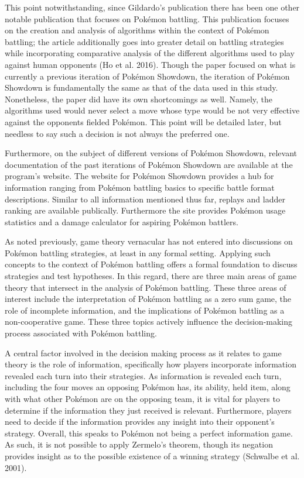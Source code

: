 \documentclass[12pt,twoside]{reedthesis}
\begin{document}
  This point notwithstanding, since Gildardo's publication there has been
  one other notable publication that focuses on Pokémon battling. This
  publication focuses on the creation and analysis of algorithms within
  the context of Pokémon battling; the article additionally goes into
  greater detail on battling strategies while incorporating comparative
  analysis of the different algorithms used to play against human
  opponents (Ho et al. 2016). Though the paper focused on what is
  currently a previous iteration of Pokémon Showdown, the iteration of
  Pokémon Showdown is fundamentally the same as that of the data used in
  this study. Nonetheless, the paper did have its own shortcomings as
  well. Namely, the algorithms used would never select a move whose type
  would be not very effective against the opponents fielded Pokémon. This
  point will be detailed later, but needless to say such a decision is not
  always the preferred one.
  
  Furthermore, on the subject of different versions of Pokémon Showdown,
  relevant documentation of the past iterations of Pokémon Showdown are
  available at the program's website. The website for Pokémon Showdown
  provides a hub for information ranging from Pokémon battling basics to
  specific battle format descriptions. Similar to all information
  mentioned thus far, replays and ladder ranking are available publically.
  Furthermore the site provides Pokémon usage statistics and a damage
  calculator for aspiring Pokémon battlers.
  
  As noted previously, game theory vernacular has not entered into
  discussions on Pokémon battling strategies, at least in any formal
  setting. Applying such concepts to the context of Pokémon battling
  offers a formal foundation to discuss strategies and test hypotheses. In
  this regard, there are three main areas of game theory that intersect in
  the analysis of Pokémon battling. These three areas of interest include
  the interpretation of Pokémon battling as a zero sum game, the role of
  incomplete information, and the implications of Pokémon battling as a
  non-cooperative game. These three topics actively influence the
  decision-making process associated with Pokémon battling.
  
  A central factor involved in the decision making process as it relates
  to game theory is the role of information, specifically how players
  incorporate information revealed each turn into their strategies. As
  information is revealed each turn, including the four moves an opposing
  Pokémon has, its ability, held item, along with what other Pokémon are
  on the opposing team, it is vital for players to determine if the
  information they just received is relevant. Furthermore, players need to
  decide if the information provides any insight into their opponent's
  strategy. Overall, this speaks to Pokémon not being a perfect
  information game. As such, it is not possible to apply Zermelo's
  theorem, though its negation provides insight as to the possible
  existence of a winning strategy (Schwalbe et al. 2001).
  
\end{document}

